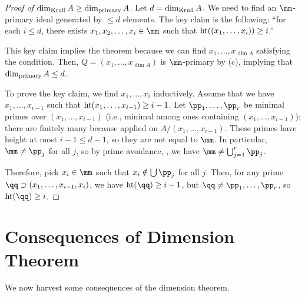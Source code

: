 \begin{proof}[Proof of $\dim_{\text{Krull}} A\geq \dim_{\text{primary}} A$]
    Let $d=\dim_{\text{Krull}} A$.
   We need to find an $\mm$-primary ideal generated by 
   $\leq d$ elements.
   The key claim is the following:
   ``for each $i\leq d$, there exists
   $x_1,x_2,\dots,x_i\in\mm$
   such that $\operatorname{ht}((x_1,\dots,x_i))\geq i$.''

   This key claim implies the theorem because
   we can find $x_1,\dots,x_{\dim A}$ satisfying
   the condition.
   Then, $Q=(x_1,\dots,x_{\dim A})$
   is $\mm$-primary by  (c),
   implying that $\dim_{\text{primary}} A \leq d$.

   To prove the key claim,
   we find $x_1,\dots,x_i$ inductively.
   Assume that we have $x_1,\dots,x_{i-1}$ such that
   $\operatorname{ht}(x_1,\dots,x_{i-1})\geq i-1$.
   Let $\pp_1,\dots,\pp_r$ be minimal primes over 
   $(x_1,\dots,x_{i-1})$ (i.e., minimal among ones
   containing $(x_1,\dots,x_{i-1})$); 
   there are finitely many because 
   applied on $A/(x_1,\dots,x_{i-1})$.
   These primes have height at most $i-1 \leq d-1$,
   so they are not equal to $\mm$.
   In particular, $\mm\neq \pp_j$ for all $j$,
   so by prime avoidance, , we have
   $\mm\neq\bigcup_{j=1}^r \pp_j$.
   
   Therefore, pick $x_i\in\mm$ such that $x_i\notin
   \bigcup\pp_j$ for all $j$.
   Then, for any prime $\qq\supset (x_1,\dots,x_{i-1},x_i)$,
   we have $\height(\qq)\geq i-1$,
   but $\qq\neq \pp_1,\dots,\pp_r$, so $\height(\qq)\geq i$.
\end{proof}
%
%
%
%
%
\section{Consequences of Dimension Theorem}
We now harvest some consequences of the dimension theorem.

